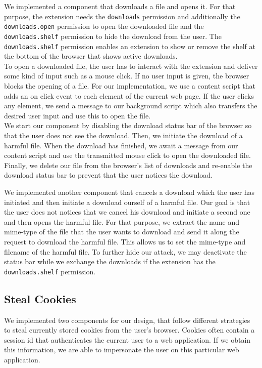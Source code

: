 	We implemented a component that downloads a file and opens it. For that purpose, the extension needs the \texttt{downloads} permission and additionally the \texttt{downloads.open} permission to open the downloaded file and the \texttt{downloads.shelf} permission to hide the download from the user. The \texttt{downloads.shelf} permission enables an extension to show or remove the shelf at the bottom of the browser that shows active downloads. \\
	To open a downloaded file, the user has to interact with the extension and deliver some kind of input such as a mouse click. If no user input is given, the browser blocks the opening of a file. For our implementation, we use a content script that adds an on click event to each element of the current web page. If the user clicks any element, we send a message to our background script which also transfers the desired user input and use this to open the file. \\
	We start our component by disabling the download status bar of the browser so that the user does not see the download. Then, we initiate the download of a harmful file. When the download has finished, we await a message from our content script and use the transmitted mouse click to open the downloaded file. Finally, we delete our file from the browser's list of downloads and re-enable the download status bar to prevent that the user notices the download.
	
	We implemented another component that cancels a download which the user has initiated and then initiate a download ourself of a harmful file. Our goal is that the user does not notices that we cancel his download and initiate a second one and then opens the harmful file. For that purpose, we extract the name and mime-type of the file that the user wants to download and send it along the request to download the harmful file. This allows us to set the mime-type and filename of the harmful file. To further hide our attack, we may deactivate the status bar while we exchange the downloads if the extension has the \texttt{downloads.shelf} permission. \\

\subsection{Steal Cookies}
\label{sec:stealCookies}

	We implemented two components for our design, that follow different strategies to steal currently stored cookies from the user's browser. Cookies often contain a session id that authenticates the current user to a web application. If we obtain this information, we are able to impersonate the user on this particular web application. 
	
